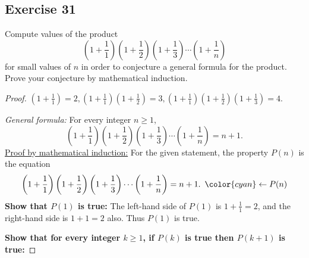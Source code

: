 \documentclass[14pt]{extarticle}
\newcommand{\dps}{\displaystyle}
\newcommand{\from}{\leftarrow}
\newcommand{\cy}{\color{cyan}}
\begin{document}
\subsection{Exercise 31}
Compute values of the product
\[
    \left(1 + \frac{1}{1}\right)\left(1 + \frac{1}{2}\right)\left(1 + \frac{1}{3}\right) \cdots \left(1 + \frac{1}{n}\right)
\]
for small values of $n$ in order to conjecture a general formula for the product. Prove your conjecture by mathematical induction.

\begin{proof}
    $\dps \left(1 + \frac{1}{1}\right) = 2, \left(1 + \frac{1}{1}\right)\left(1 + \frac{1}{2}\right) = \dps 3,
        \left(1 + \frac{1}{1}\right)\left(1 + \frac{1}{2}\right)\left(1 + \frac{1}{3}\right) = \dps 4$.

        {\it General formula:} For every integer $n \geq 1$,
    \[
        \dps \left(1 + \frac{1}{1}\right)\left(1 + \frac{1}{2}\right)\left(1 + \frac{1}{3}\right) \cdots \left(1 + \frac{1}{n}\right) = n+1.
    \]
    \underline{Proof by mathematical induction:}
    For the given statement, the property $P(n)$ is the equation
    \[
        \dps \left(1 + \frac{1}{1}\right)\left(1 + \frac{1}{2}\right)\left(1 + \frac{1}{3}\right) \cdots \left(1 + \frac{1}{n}\right) = n+1. \,\,\, {\cy \from P(n)}
    \]
    {\bf Show that $P(1)$ is true:} The left-hand side of $P(1)$ is $1 + \frac{1}{1} = 2$, and the right-hand side is $1 + 1 = 2$ also. Thus $P(1)$ is true.

        {\bf Show that for every integer $k \geq 1$, if $P(k)$ is true then $P(k + 1)$ is true:}


\end{proof}
\end{document}
